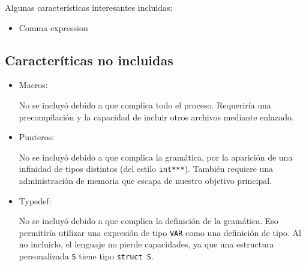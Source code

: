 \documentclass[12pt]{article}
\begin{document}
Algunas caracter\'isticas interesantes incluidas:
\begin{itemize}
    \item Comma expression
\end{itemize}

\subsection*{Caracter\'iticas no incluidas}
\begin{itemize}
    \item Macros:

    No se incluy\'o debido a que complica todo el proceso. Requerir\'ia una precompilaci\'on y la capacidad de incluir otros archivos mediante enlazado.
    \item Punteros:

    No se incluy\'o debido a que complica la gram\'atica, por la aparici\'on de una infinidad de tipos distintos (del estilo \texttt{int***}). Tambi\'en requiere una administraci\'on de memoria que escapa de nuestro objetivo principal.

    \item Typedef:

    No se incluy\'o debido a que complica la definici\'on de la gram\'atica. Eso permitir\'ia utilizar una expresi\'on de tipo \texttt{VAR} como una definici\'on de tipo. Al no incluirlo, el lenguaje no pierde capacidades, ya que una estructura personalizada \texttt{S} tiene tipo \texttt{struct S}.
\end{itemize}
\end{document}
